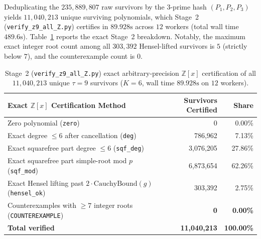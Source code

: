 \documentclass[11pt]{article}
\newcommand{\Z}{\mathbb{Z}}
\newcommand{\code}[1]{\texttt{#1}}
\begin{document}
Deduplicating the $235{,}889{,}807$ raw survivors by the $3$-prime hash $(P_1, P_2, P_3)$ yields $11{,}040{,}213$ unique surviving polynomials, which Stage~2 (\code{verify\_z9\_all\_Z.py}) certifies in $89.928\text{s}$ across $12$ workers (total wall time $489.6\text{s}$). Table~\ref{tab:stage2} reports the exact Stage~2 breakdown. Notably, the maximum exact integer root count among all $303{,}392$ Hensel-lifted survivors is $5$ (strictly below $7$), and the counterexample count is $0$.

\begin{table}[ht]
\centering
\small
\caption{Stage~2 (\code{verify\_z9\_all\_Z.py}) exact arbitrary-precision $\Z[x]$ certification of all $11{,}040{,}213$ unique $\tau = 9$ survivors ($K = 6$, wall time $89.928\text{s}$ on $12$ workers).}
\label{tab:stage2}
\begin{tabular}{@{}lrr@{}}
\toprule
Exact $\Z[x]$ Certification Method & Survivors Certified & Share \\
\midrule
Zero polynomial (\code{zero}) & 0 & 0.00\% \\
Exact degree $\le 6$ after cancellation (\code{deg}) & 786,962 & 7.13\% \\
Exact squarefree part degree $\le 6$ (\code{sqf\_deg}) & 3,076,205 & 27.86\% \\
Exact squarefree part simple-root mod $p$ (\code{sqf\_mod}) & 6,873,654 & 62.26\% \\
Exact Hensel lifting past $2 \cdot \mathrm{CauchyBound}(g)$ (\code{hensel\_ok}) & 303,392 & 2.75\% \\
Counterexamples with $\ge 7$ integer roots (\code{COUNTEREXAMPLE}) & \textbf{0} & \textbf{0.00\%} \\
\midrule
\textbf{Total verified} & \textbf{11,040,213} & \textbf{100.00\%} \\
\bottomrule
\end{tabular}
\end{table}
\end{document}
